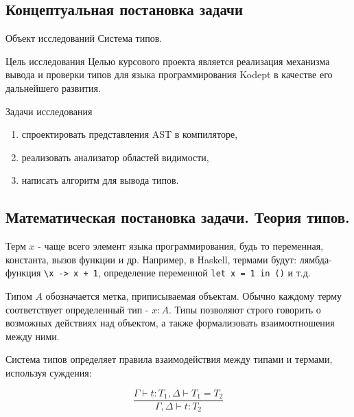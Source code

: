 \subsection{Концептуальная постановка задачи}
\begin{frame}%

\begin{block}{Объект исследований}
	Система типов.
\end{block}

\begin{block}{Цель исследования}
	Целью курсового проекта является реализация механизма вывода и проверки типов для языка программирования Kodept в качестве его дальнейшего развития.
\end{block}

\begin{block}{Задачи исследования}
\begin{enumerate}
	\item спроектировать представления AST в компиляторе,
	\item реализовать анализатор областей видимости,
	\item написать алгоритм для вывода типов.
\end{enumerate}
\end{block}


\end{frame}
\subsection{Математическая постановка задачи. Теория типов.}
\begin{frame}%

	\begin{definition}
		Терм $x$ - чаще всего элемент языка программирования, будь то переменная, константа, вызов функции и др.
		Например, в Haskell, термами будут: лямбда-функция \lstinline{\x -> x + 1}, определение переменной \lstinline{let x = 1 in ()} и т.д.
	\end{definition}

	\begin{definition}
		Типом $A$ обозначается метка, приписываемая объектам.
		Обычно каждому терму соответствует определенный тип - $x: A$.
		Типы позволяют строго говорить о возможных действиях над объектом, а также формализовать взаимоотношения между ними.
	\end{definition}

	Система типов определяет правила взаимодействия между типами и термами, используя суждения:

	\[
		\frac{\Gamma \vdash t: T_1, \Delta \vdash T_1 = T_2}{\Gamma, \Delta \vdash t: T_2}
	\]

\end{frame}
